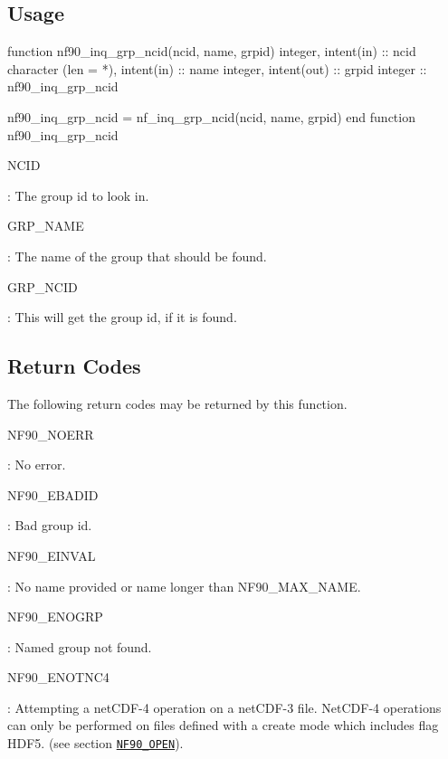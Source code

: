 \subsection*{Usage}


\begin{DoxyCode}
\textcolor{keyword}{function }nf90\_inq\_grp\_ncid(ncid, name, grpid)
  \textcolor{keywordtype}{integer}, \textcolor{keywordtype}{intent(in)} :: ncid
  \textcolor{keywordtype}{character (len = *)}, \textcolor{keywordtype}{intent(in)} :: name
  \textcolor{keywordtype}{integer}, \textcolor{keywordtype}{intent(out)} :: grpid
  \textcolor{keywordtype}{integer} :: nf90\_inq\_grp\_ncid

  nf90\_inq\_grp\_ncid = nf\_inq\_grp\_ncid(ncid, name, grpid)
\textcolor{keyword}{end function }nf90\_inq\_grp\_ncid
\end{DoxyCode}


{\ttfamily N\+C\+ID}

\+: The group id to look in.

{\ttfamily G\+R\+P\+\_\+\+N\+A\+ME}

\+: The name of the group that should be found.

{\ttfamily G\+R\+P\+\_\+\+N\+C\+ID}

\+: This will get the group id, if it is found.

\subsection*{Return Codes}

The following return codes may be returned by this function.

{\ttfamily N\+F90\+\_\+\+N\+O\+E\+RR}

\+: No error.

{\ttfamily N\+F90\+\_\+\+E\+B\+A\+D\+ID}

\+: Bad group id.

{\ttfamily N\+F90\+\_\+\+E\+I\+N\+V\+AL}

\+: No name provided or name longer than N\+F90\+\_\+\+M\+A\+X\+\_\+\+N\+A\+ME.

{\ttfamily N\+F90\+\_\+\+E\+N\+O\+G\+RP}

\+: Named group not found.

{\ttfamily N\+F90\+\_\+\+E\+N\+O\+T\+N\+C4}

\+: Attempting a net\+C\+D\+F-\/4 operation on a net\+C\+D\+F-\/3 file. Net\+C\+D\+F-\/4 operations can only be performed on files defined with a create mode which includes flag H\+D\+F5. (see section \href{#NF90_005fOPEN}{\tt N\+F90\+\_\+\+O\+P\+EN}).

